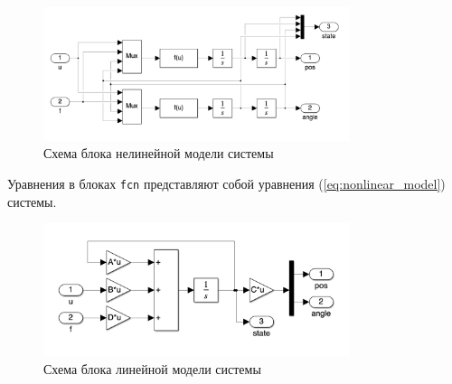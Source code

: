 \begin{figure}[ht!]
    \centering
    \includegraphics[width=0.8\textwidth]{media/scheme_unlinear.png}
    \caption{Схема блока нелинейной модели системы}
    \label{fig:scheme_unlinear}
\end{figure}
Уравнения в блоках \texttt{fcn} представляют собой уравнения (\ref{eq:nonlinear_model}) системы. 

\begin{figure}[ht!]
    \centering
    \includegraphics[width=0.8\textwidth]{media/scheme_linear.png}
    \caption{Схема блока линейной модели системы}
    \label{fig:scheme_linear}
\end{figure}

